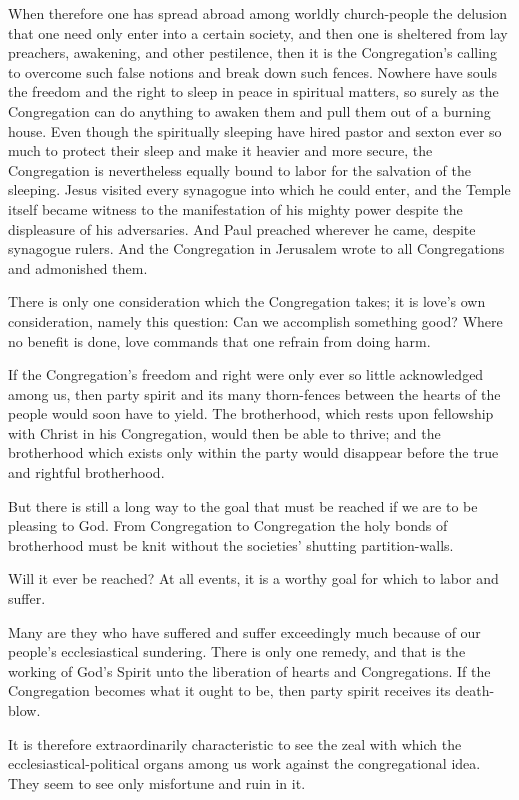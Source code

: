 When therefore one has spread abroad among worldly church-people the delusion that one need only enter into a certain society, and then one is sheltered from lay preachers, awakening, and other pestilence, then it is the Congregation’s calling to overcome such false notions and break down such fences. Nowhere have souls the freedom and the right to sleep in peace in spiritual matters, so surely as the Congregation can do anything to awaken them and pull them out of a burning house. Even though the spiritually sleeping have hired pastor and sexton ever so much to protect their sleep and make it heavier and more secure, the Congregation is nevertheless equally bound to labor for the salvation of the sleeping. Jesus visited every synagogue into which he could enter, and the Temple itself became witness to the manifestation of his mighty power despite the displeasure of his adversaries. And Paul preached wherever he came, despite synagogue rulers. And the Congregation in Jerusalem wrote to all Congregations and admonished them.

There is only one consideration which the Congregation takes; it is love’s own consideration, namely this question: Can we accomplish something good? Where no benefit is done, love commands that one refrain from doing harm.

If the Congregation’s freedom and right were only ever so little acknowledged among us, then party spirit and its many thorn-fences between the hearts of the people would soon have to yield. The brotherhood, which rests upon fellowship with Christ in his Congregation, would then be able to thrive; and the brotherhood which exists only within the party would disappear before the true and rightful brotherhood.

But there is still a long way to the goal that must be reached if we are to be pleasing to God. From Congregation to Congregation the holy bonds of brotherhood must be knit without the societies’ shutting partition-walls.

Will it ever be reached? At all events, it is a worthy goal for which to labor and suffer.

Many are they who have suffered and suffer exceedingly much because of our people’s ecclesiastical sundering. There is only one remedy, and that is the working of God’s Spirit unto the liberation of hearts and Congregations. If the Congregation becomes what it ought to be, then party spirit receives its death-blow.

It is therefore extraordinarily characteristic to see the zeal with which the ecclesiastical-political organs among us work against the congregational idea. They seem to see only misfortune and ruin in it.

